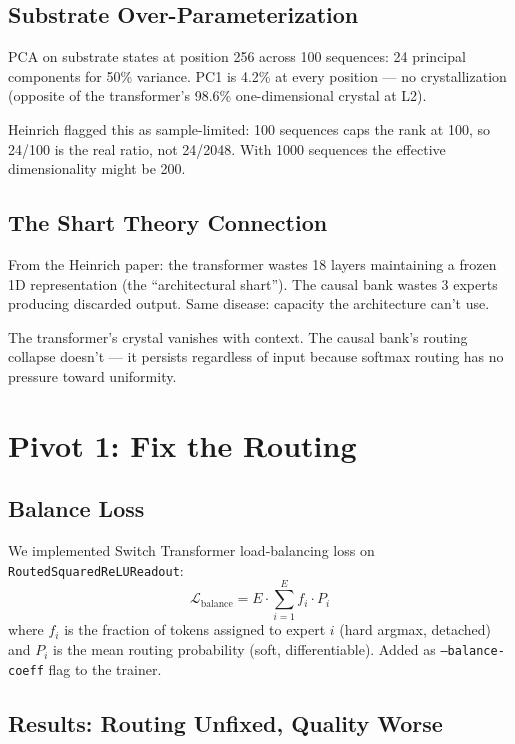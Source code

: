 \documentclass[11pt,a4paper]{report}
\begin{document}
\section{Substrate Over-Parameterization}

PCA on substrate states at position 256 across 100 sequences: 24 principal components for 50\% variance. PC1 is 4.2\% at every position --- no crystallization (opposite of the transformer's 98.6\% one-dimensional crystal at L2).

Heinrich flagged this as sample-limited: 100 sequences caps the rank at 100, so 24/100 is the real ratio, not 24/2048. With 1000 sequences the effective dimensionality might be 200.

\section{The Shart Theory Connection}

From the Heinrich paper: the transformer wastes 18 layers maintaining a frozen 1D representation (the ``architectural shart''). The causal bank wastes 3 experts producing discarded output. Same disease: capacity the architecture can't use.

The transformer's crystal vanishes with context. The causal bank's routing collapse doesn't --- it persists regardless of input because softmax routing has no pressure toward uniformity.

\chapter{Pivot 1: Fix the Routing}

\section{Balance Loss}

We implemented Switch Transformer load-balancing loss on \texttt{RoutedSquaredReLUReadout}:
\[
\mathcal{L}_{\text{balance}} = E \cdot \sum_{i=1}^{E} f_i \cdot P_i
\]
where $f_i$ is the fraction of tokens assigned to expert $i$ (hard argmax, detached) and $P_i$ is the mean routing probability (soft, differentiable). Added as \texttt{--balance-coeff} flag to the trainer.

\section{Results: Routing Unfixed, Quality Worse}
\end{document}
